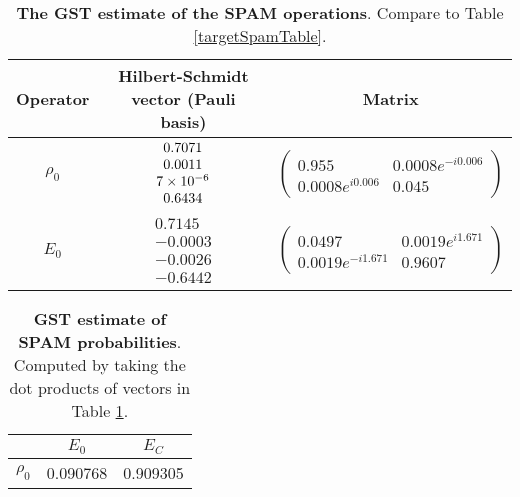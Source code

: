 {\begin{table}[h]
\begin{center}
\begin{tabular}[l]{|c|c|c|}
\hline
Operator & Hilbert-Schmidt vector (Pauli basis) & Matrix \\ \hline
$\rho_{0}$ & $ \begin{array}{c}
0.7071 \\ 
0.0011 \\ 
7\times 10^{-6} \\ 
0.6434
 \end{array} $
 & $ \left(\!\!\begin{array}{cc}
0.955 & 0.0008e^{-i0.006} \\ 
0.0008e^{i0.006} & 0.045
 \end{array}\!\!\right) $
 \\ \hline
$E_{0}$ & $ \begin{array}{c}
0.7145 \\ 
-0.0003 \\ 
-0.0026 \\ 
-0.6442
 \end{array} $
 & $ \left(\!\!\begin{array}{cc}
0.0497 & 0.0019e^{i1.671} \\ 
0.0019e^{-i1.671} & 0.9607
 \end{array}\!\!\right) $
 \\ \hline
\end{tabular}

\caption{\textbf{The GST estimate of the SPAM operations}.  Compare to Table \ref{targetSpamTable}.\label{bestCPTPGatesetSpamTable}}
\end{center}
\end{table}

\begin{table}[h]
\begin{center}
\begin{tabular}[l]{|c|c|c|}
\hline
 & $E_{0}$ & $E_C$ \\ \hline
$\rho_{0}$ & 0.090768 & 0.909305 \\ \hline
\end{tabular}

\caption{\textbf{GST estimate of SPAM probabilities}.  Computed by taking the dot products of vectors in Table \ref{bestCPTPGatesetSpamTable}.\label{bestCPTPGatesetSpamParametersTable}}
\end{center}
\end{table}

}
